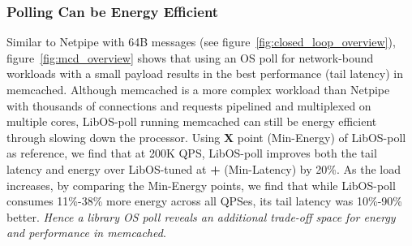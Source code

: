 
\subsubsection{Polling Can be Energy Efficient}
\label{sec:mcd:poll}
Similar to Netpipe with 64B messages (see figure~\ref{fig:closed_loop_overview}), figure~\ref{fig:mcd_overview} shows that using an OS poll for network-bound workloads with a small payload results in the best performance (tail latency) in memcached. Although memcached is a more complex workload than Netpipe with thousands of connections and requests pipelined and multiplexed on multiple cores, LibOS-poll running memcached can still be energy efficient through slowing down the processor. Using \textbf{X} point (Min-Energy) of LibOS-poll as reference, we find that at 200K QPS, LibOS-poll improves both the tail latency and energy over LibOS-tuned at \textbf{+} (Min-Latency) by 20\%. As the load increases, by comparing the Min-Energy points, we find that while LibOS-poll consumes 11\%-38\% more energy across all QPSes, its tail latency was 10\%-90\% better. \textit{Hence a library OS poll reveals an additional trade-off space for energy and performance in memcached}.


